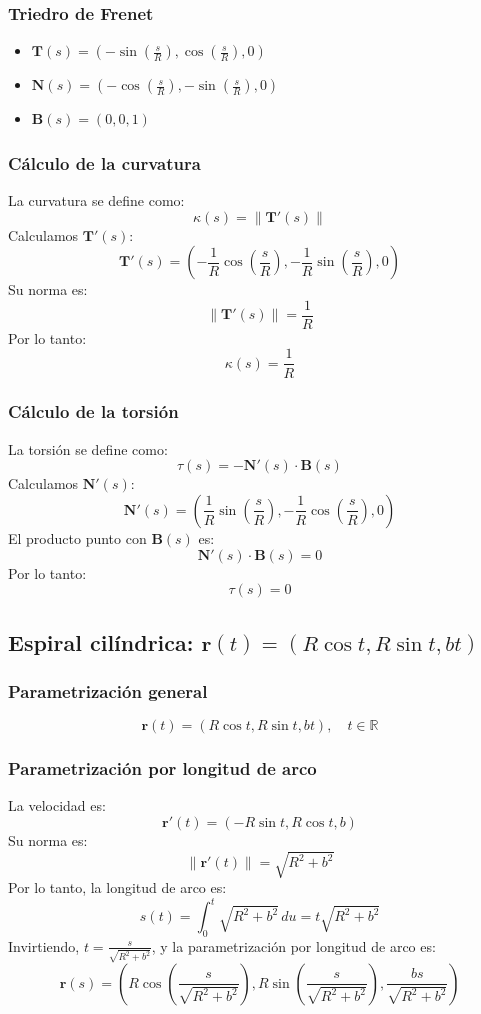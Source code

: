 \documentclass[11pt]{book}
\theoremstyle{definicion}
\theoremstyle{teorema}
\theoremstyle{ejemplo}
\begin{document}
\subsubsection{Triedro de Frenet}
\begin{itemize}
    \item \( \displaystyle \mathbf{T}(s) = \left(-\sin\left(\frac{s}{R}\right), \cos\left(\frac{s}{R}\right), 0\right)\)
    \item \(\displaystyle \mathbf{N}(s) = \left(-\cos\left(\frac{s}{R}\right), -\sin\left(\frac{s}{R}\right), 0\right)\)
    \item \(\mathbf{B}(s) = (0, 0, 1)\)
\end{itemize}

\subsubsection{Cálculo de la curvatura}
\noindent La curvatura se define como:
\[
\kappa(s) = \|\mathbf{T}'(s)\|
\]
Calculamos \(\mathbf{T}'(s)\):
\[
\mathbf{T}'(s) = \left(-\frac{1}{R}\cos\left(\frac{s}{R}\right), -\frac{1}{R}\sin\left(\frac{s}{R}\right), 0\right)
\]
Su norma es:
\[
\|\mathbf{T}'(s)\| = \frac{1}{R}
\]
Por lo tanto:
\[
\kappa(s) = \frac{1}{R}
\]

\subsubsection{Cálculo de la torsión}
\noindent La torsión se define como:
\[
\tau(s) = -\mathbf{N}'(s) \cdot \mathbf{B}(s)
\]
Calculamos \(\mathbf{N}'(s)\):
\[
\mathbf{N}'(s) = \left(\frac{1}{R}\sin\left(\frac{s}{R}\right), -\frac{1}{R}\cos\left(\frac{s}{R}\right), 0\right)
\]
El producto punto con \(\mathbf{B}(s)\) es:
\[
\mathbf{N}'(s) \cdot \mathbf{B}(s) = 0
\]
Por lo tanto:
\[
\tau(s) = 0
\]

\subsection{Espiral cilíndrica: \(\mathbf{r}(t) = (R\cos t, R\sin t, bt)\)}

\subsubsection{Parametrización general}
\[
\mathbf{r}(t) = (R\cos t, R\sin t, bt), \quad t \in \mathbb{R}
\]

\subsubsection{Parametrización por longitud de arco}
\noindent
La velocidad es:
\[
\mathbf{r}'(t) = (-R\sin t, R\cos t, b)
\]
Su norma es:
\[
\|\mathbf{r}'(t)\| = \sqrt{R^2 + b^2}
\]
Por lo tanto, la longitud de arco es:
\[
s(t) = \int_0^t \sqrt{R^2 + b^2} \, du = t\sqrt{R^2 + b^2}
\]
Invirtiendo, \(t = \frac{s}{\sqrt{R^2 + b^2}}\), y la parametrización por longitud de arco es:
\[
\mathbf{r}(s) = \left(R\cos\left(\frac{s}{\sqrt{R^2 + b^2}}\right), R\sin\left(\frac{s}{\sqrt{R^2 + b^2}}\right), \frac{bs}{\sqrt{R^2 + b^2}}\right)
\]
\end{document}
